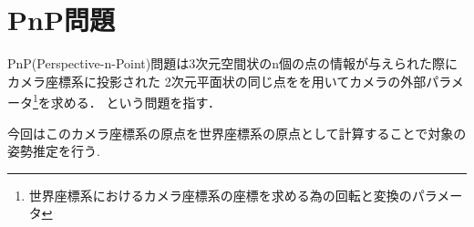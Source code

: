 \section{PnP問題}
PnP(Perspective-n-Point)問題は3次元空間状のn個の点の情報が与えられた際にカメラ座標系に投影された
2次元平面状の同じ点をを用いてカメラの外部パラメータ\footnote{世界座標系におけるカメラ座標系の座標を求める為の回転と変換のパラメータ}を求める．
という問題を指す．

今回はこのカメラ座標系の原点を世界座標系の原点として計算することで対象の姿勢推定を行う.